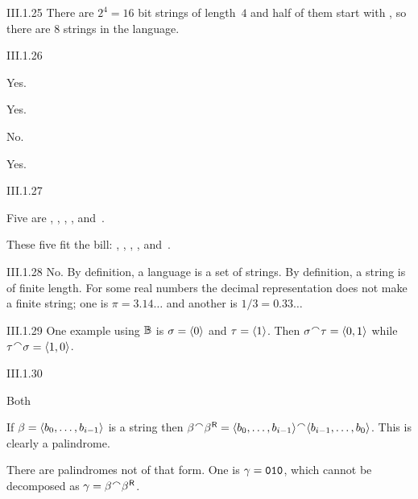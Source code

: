 %
\begin{ans}{III.1.25}
There are $2^4=16$ bit strings of length~$4$ and half of them
start with , so there are $8$ strings in the language.
\end{ans}
%
\begin{ans}{III.1.26}
\begin{exparts}
\item Yes.
\item Yes.
\item No.
\item Yes.
\end{exparts}
\end{ans}
%
\begin{ans}{III.1.27}
\begin{exparts}
\item Five are , , , , and~.
\item These five fit the bill: , , , ,
  and~.
\end{exparts}
\end{ans}
%
\begin{ans}{III.1.28}
No.
By definition, a language is a set of strings.
By definition, a string is of finite length.
For some real numbers the decimal representation does not make a finite string;
one is $\pi=3.14\ldots$ and another is $1/3=0.33\ldots$
\end{ans}
%
\begin{ans}{III.1.29}
One example using $\mathbb{B}$ is $\sigma=\langle0\rangle$ and $\tau=\langle1\rangle$.
Then $\sigma\concat\tau=\sequence{0,1}$ while
$\tau\concat\sigma=\sequence{1,0}$.
\end{ans}
%
\begin{ans}{III.1.30}
\begin{exparts}
\item
Both
\item
If $\beta=\langle b_0,\ldots,b_{i-1}\rangle$ is a string then
$\beta\concat\reversal{\beta}
  =\sequence{b_0,\ldots,b_{i-1}}\concat\sequence{b_{i-1},\ldots,b_0}$.
This is clearly a palindrome.
\item
There are palindromes not of that form.
One is $\gamma=\texttt{010}$, which
cannot be decomposed as $\gamma=\beta\concat\reversal{\beta}$.
\end{exparts}
\end{ans}
